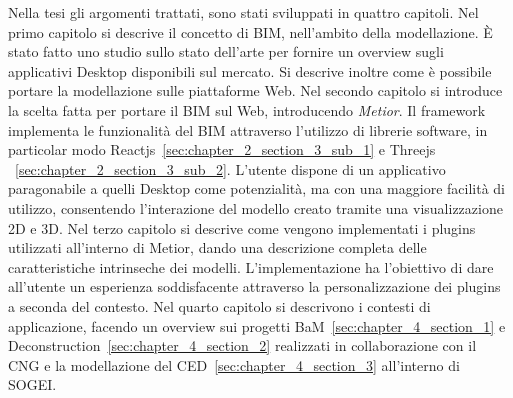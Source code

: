 Nella tesi gli argomenti trattati, sono stati sviluppati in quattro capitoli.
Nel primo capitolo si descrive il concetto di BIM,
nell'ambito della modellazione. \`E stato fatto uno studio sullo stato dell'arte
per fornire un overview sugli applicativi Desktop disponibili sul mercato.
Si descrive inoltre come \`e possibile portare la modellazione sulle piattaforme Web.
Nel secondo capitolo si introduce la scelta fatta per portare il BIM sul Web, introducendo \emph{Metior}.
Il framework implementa le funzionalit\`a del BIM attraverso l'utilizzo di librerie software,
in particolar modo Reactjs~\ref{sec:chapter_2_section_3_sub_1} e Threejs ~\ref{sec:chapter_2_section_3_sub_2}.
L'utente dispone di un applicativo paragonabile a quelli
Desktop come potenzialità, ma con una maggiore facilità di utilizzo, consentendo l'interazione del modello creato
tramite una visualizzazione 2D e 3D.
Nel terzo capitolo si descrive come vengono implementati i plugins utilizzati all'interno di Metior,
dando una descrizione completa delle caratteristiche intrinseche dei modelli. L'implementazione ha l'obiettivo
di dare all'utente un esperienza soddisfacente attraverso la personalizzazione dei plugins a seconda del contesto.
Nel quarto capitolo si descrivono i contesti di applicazione, facendo un overview sui progetti BaM~\ref{sec:chapter_4_section_1}
 e Deconstruction~\ref{sec:chapter_4_section_2} realizzati in collaborazione con il CNG
e la modellazione del CED~\ref{sec:chapter_4_section_3} all'interno di SOGEI.
